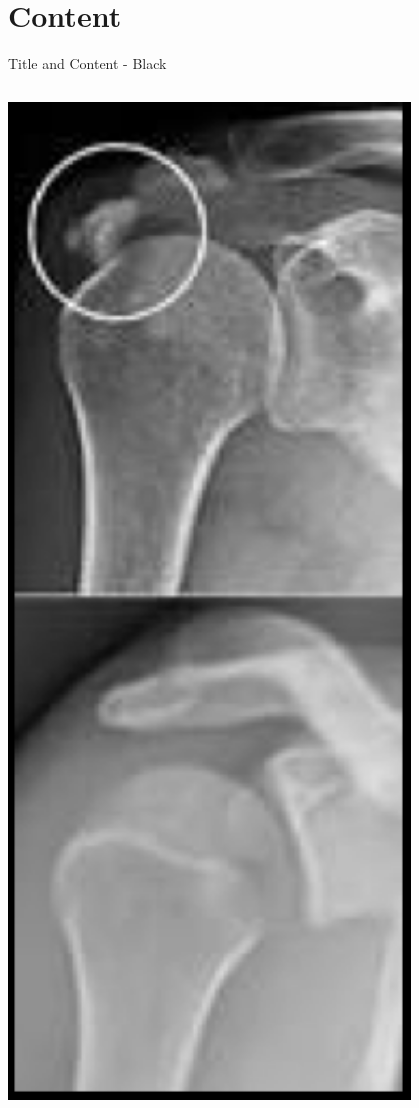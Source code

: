 \documentclass[10pt]{beamer} %
\begin{document}
\section{Content}
{\blackSlide %
\begin{frame}{Title and Content - Black}
\begin{columns}
  \begin{column}{0.3\textwidth}
    \begin{center}
     \includegraphics[width=0.8\textwidth]{Images/xray.png}

\end{center}
\end{column}
\end{columns}
\end{frame}}
\end{document}
